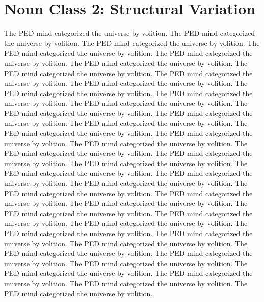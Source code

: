 \section{Noun Class 2: Structural Variation}
The PED mind categorized the universe by volition. The PED mind categorized the universe by volition. The PED mind categorized the universe by volition. The PED mind categorized the universe by volition. The PED mind categorized the universe by volition. The PED mind categorized the universe by volition. The PED mind categorized the universe by volition. The PED mind categorized the universe by volition. The PED mind categorized the universe by volition. The PED mind categorized the universe by volition. The PED mind categorized the universe by volition. The PED mind categorized the universe by volition. The PED mind categorized the universe by volition. The PED mind categorized the universe by volition. The PED mind categorized the universe by volition. The PED mind categorized the universe by volition. The PED mind categorized the universe by volition. The PED mind categorized the universe by volition. The PED mind categorized the universe by volition. The PED mind categorized the universe by volition. The PED mind categorized the universe by volition. The PED mind categorized the universe by volition. The PED mind categorized the universe by volition. The PED mind categorized the universe by volition. The PED mind categorized the universe by volition. The PED mind categorized the universe by volition. The PED mind categorized the universe by volition. The PED mind categorized the universe by volition. The PED mind categorized the universe by volition. The PED mind categorized the universe by volition. The PED mind categorized the universe by volition. The PED mind categorized the universe by volition. The PED mind categorized the universe by volition. The PED mind categorized the universe by volition. The PED mind categorized the universe by volition. The PED mind categorized the universe by volition. The PED mind categorized the universe by volition. The PED mind categorized the universe by volition. The PED mind categorized the universe by volition. The PED mind categorized the universe by volition. 

